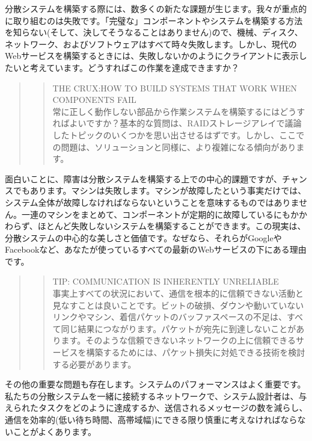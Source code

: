分散システムを構築する際には、数多くの新たな課題が生じます。我々が重点的に取り組むのは失敗です。「完璧な」コンポーネントやシステムを構築する方法を知らない(そして、決してそうなることはありません)ので、機械、ディスク、ネットワーク、およびソフトウェアはすべて時々失敗します。しかし、現代のWebサービスを構築するときには、失敗しないかのようにクライアントに表示したいと考えています。どうすればこの作業を達成できますか？

\begin{quote}
\begin{quote}
THE CRUX:HOW TO BUILD SYSTEMS THAT WORK WHEN COMPONENTS FAIL\\
常に正しく動作しない部品から作業システムを構築するにはどうすればよいですか？基本的な質問は、RAIDストレージアレイで議論したトピックのいくつかを思い出させるはずです。しかし、ここでの問題は、ソリューションと同様に、より複雑になる傾向があります。
\end{quote}
\end{quote}

面白いことに、障害は分散システムを構築する上での中心的課題ですが、チャンスでもあります。マシンは失敗します。マシンが故障したという事実だけでは、システム全体が故障しなければならないということを意味するものではありません。一連のマシンをまとめて、コンポーネントが定期的に故障しているにもかかわらず、ほとんど失敗しないシステムを構築することができます。この現実は、分散システムの中心的な美しさと価値です。なぜなら、それらがGoogleやFacebookなど、あなたが使っているすべての最新のWebサービスの下にある理由です。

\begin{quote}
\begin{quote}
TIP: COMMUNICATION IS INHERENTLY UNRELIABLE\\
事実上すべての状況において、通信を根本的に信頼できない活動と見なすことは良いことです。ビットの破損、ダウンや動いていないリンクやマシン、着信パケットのバッファスペースの不足は、すべて同じ結果につながります。パケットが宛先に到達しないことがあります。そのような信頼できないネットワークの上に信頼できるサービスを構築するためには、パケット損失に対処できる技術を検討する必要があります。
\end{quote}
\end{quote}

その他の重要な問題も存在します。システムのパフォーマンスはよく重要です。私たちの分散システムを一緒に接続するネットワークで、システム設計者は、与えられたタスクをどのように達成するか、送信されるメッセージの数を減らし、通信を効率的(低い待ち時間、高帯域幅)にできる限り慎重に考えなければならないことがよくあります。

